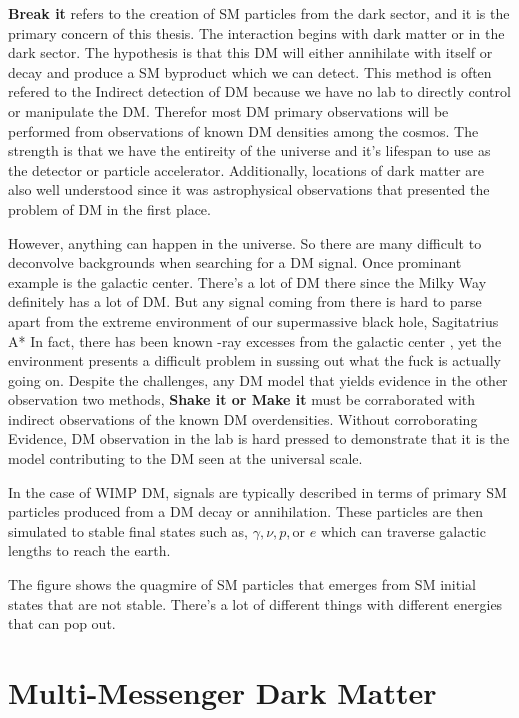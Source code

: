 \textbf{Break it} refers to the creation of SM particles from the dark sector, and it is the primary concern of this thesis.
The interaction begins with dark matter or in the dark sector.
The hypothesis is that this DM will either annihilate with itself or decay and produce a SM byproduct which we can detect.
This method is often refered to the Indirect detection of DM because we have no lab to directly control or manipulate the DM.
Therefor most DM primary observations will be performed from observations of known DM densities among the cosmos.
The strength is that we have the entireity of the universe and it's lifespan to use as the detector or particle accelerator.
Additionally, locations of dark matter are also well understood since it was astrophysical observations that presented the problem of DM in the first place.

However, anything can happen in the universe.
So there are many difficult to deconvolve backgrounds when searching for a DM signal.
Once prominant example is the galactic center.
There's a lot of DM there since the Milky Way definitely has a lot of DM.
But any signal coming from there is hard to parse apart from the extreme environment of our supermassive black hole, Sagitatrius A*
In fact, there has been known \textgamma -ray excesses from the galactic center \ns, yet the environment presents a difficult problem in sussing out what the fuck is actually going on.
Despite the challenges, any DM model that yields evidence in the other observation two methods, \textbf{Shake it or Make it} must be corraborated with indirect observations of the known DM overdensities.
Without corroborating Evidence, DM observation in the lab is hard pressed to demonstrate that it is the model contributing to the DM seen at the universal scale.

In the case of WIMP DM, signals are typically described in terms of primary SM particles produced from a DM decay or annihilation.
These particles are then simulated to stable final states such as, $\gamma, \nu, p, \text{or } e$ which can traverse galactic lengths to reach the earth.


The figure shows the quagmire of SM particles that emerges from SM initial states that are not stable.
There's a lot of different things with different energies that can pop out.

\section{Multi-Messenger Dark Matter}

